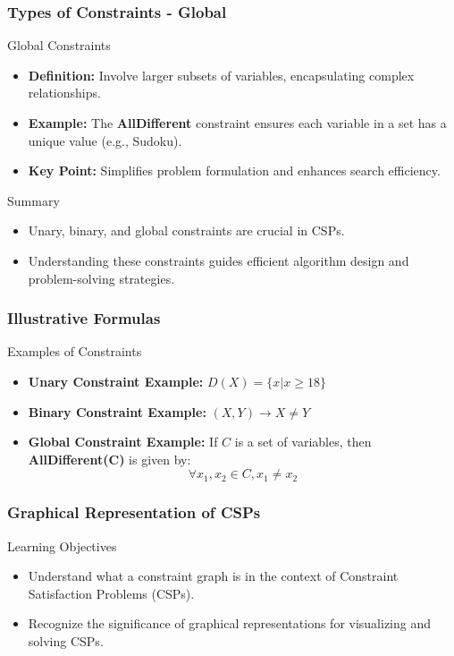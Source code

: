 \documentclass[aspectratio=169]{beamer}
\begin{document}
\begin{frame}[fragile]
    \frametitle{Types of Constraints - Global}
    \begin{block}{Global Constraints}
        \begin{itemize}
            \item \textbf{Definition:} Involve larger subsets of variables, encapsulating complex relationships.
            \item \textbf{Example:} The \textbf{AllDifferent} constraint ensures each variable in a set has a unique value (e.g., Sudoku).
            \item \textbf{Key Point:} Simplifies problem formulation and enhances search efficiency.
        \end{itemize}
    \end{block}

    \begin{block}{Summary}
        \begin{itemize}
            \item Unary, binary, and global constraints are crucial in CSPs.
            \item Understanding these constraints guides efficient algorithm design and problem-solving strategies.
        \end{itemize}
    \end{block}
\end{frame}

\begin{frame}[fragile]
    \frametitle{Illustrative Formulas}
    \begin{block}{Examples of Constraints}
        \begin{itemize}
            \item \textbf{Unary Constraint Example:} \( D(X) = \{ x | x \geq 18 \} \)
            \item \textbf{Binary Constraint Example:} \( (X, Y) \rightarrow X \neq Y \)
            \item \textbf{Global Constraint Example:} If \( C \) is a set of variables, then \textbf{AllDifferent(C)} is given by:
            \begin{equation}
                \forall x_1, x_2 \in C, x_1 \neq x_2
            \end{equation}
        \end{itemize}
    \end{block}
\end{frame}

\begin{frame}[fragile]
    \frametitle{Graphical Representation of CSPs}
    \begin{block}{Learning Objectives}
        \begin{itemize}
            \item Understand what a constraint graph is in the context of Constraint Satisfaction Problems (CSPs).
            \item Recognize the significance of graphical representations for visualizing and solving CSPs.
        \end{itemize}
    \end{block}
\end{frame}
\end{document}
